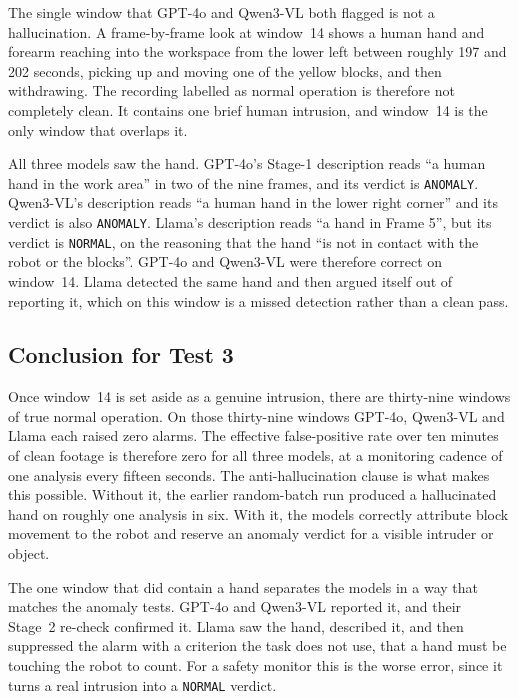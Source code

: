 \documentclass[11pt,a4paper]{article}
\begin{document}
The single window that GPT-4o and Qwen3-VL both flagged is not a
hallucination. A frame-by-frame look at window~14 shows a human hand and
forearm reaching into the workspace from the lower left between roughly
197 and 202 seconds, picking up and moving one of the yellow blocks, and
then withdrawing. The recording labelled as normal operation is therefore
not completely clean. It contains one brief human intrusion, and window~14
is the only window that overlaps it.

All three models saw the hand. GPT-4o's Stage-1 description reads ``a
human hand in the work area'' in two of the nine frames, and its verdict
is \texttt{ANOMALY}. Qwen3-VL's description reads ``a human hand in the
lower right corner'' and its verdict is also \texttt{ANOMALY}. Llama's
description reads ``a hand in Frame 5'', but its verdict is
\texttt{NORMAL}, on the reasoning that the hand ``is not in contact with
the robot or the blocks''. GPT-4o and Qwen3-VL were therefore correct on
window~14. Llama detected the same hand and then argued itself out of
reporting it, which on this window is a missed detection rather than a
clean pass.

\subsection{Conclusion for Test 3}

Once window~14 is set aside as a genuine intrusion, there are thirty-nine
windows of true normal operation. On those thirty-nine windows GPT-4o,
Qwen3-VL and Llama each raised zero alarms. The effective false-positive
rate over ten minutes of clean footage is therefore zero for all three
models, at a monitoring cadence of one analysis every fifteen seconds.
The anti-hallucination clause is what makes this possible. Without it, the
earlier random-batch run produced a hallucinated hand on roughly one
analysis in six. With it, the models correctly attribute block movement to
the robot and reserve an anomaly verdict for a visible intruder or object.

The one window that did contain a hand separates the models in a way that
matches the anomaly tests. GPT-4o and Qwen3-VL reported it, and their
Stage~2 re-check confirmed it. Llama saw the hand, described it, and then
suppressed the alarm with a criterion the task does not use, that a hand
must be touching the robot to count. For a safety monitor this is the
worse error, since it turns a real intrusion into a \texttt{NORMAL}
verdict.
\end{document}
